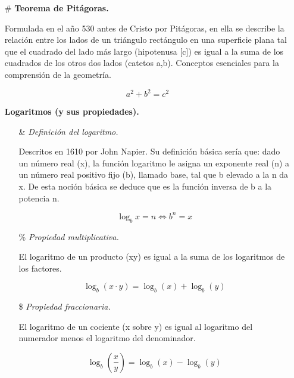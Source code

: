 \documentclass[12pt,letterpaper]{article}
\begin{document}
\begin{itemize}

    \item[\#] \textbf{Teorema de Pitágoras.}\newline
    
    Formulada en el año 530 antes de Cristo por Pitágoras, en ella se describe la relación entre los lados de un triángulo rectángulo en una superficie plana tal que el cuadrado del lado más largo (hipotenusa [c]) es igual a la suma de los cuadrados de los otros dos lados (catetos a,b). Conceptos esenciales para la comprensión de la geometría.
    
    $$a^{2}+b^{2}=c^{2}$$
    
    \item[] \textbf{Logaritmos (y sus propiedades).}\newline

        \begin{itemize}
            
            \item[\&] \textit{Definición del logaritmo.}\newline
            
            Descritos en 1610 por John Napier. Su definición básica sería que: dado un número real (x), la función logaritmo le asigna un exponente real (n) a un número real positivo fijo (b), llamado base, tal que b elevado a la n da x. De esta noción básica se deduce que es la función inversa de b a la potencia n.
    
            $$\log _{b}x=n \Leftrightarrow b^{n}=x$$
            
            \item[\%] \textit{Propiedad multiplicativa.}\newline
    
            El logaritmo de un producto (xy) es igual a la suma de los logaritmos de los factores.
            
            $$\log _{b}(x\cdot y)=\log _{b}(x)+\log _{b}(y)$$
            
            \item[\$] \textit{Propiedad fraccionaria.}\newline
    
            El logaritmo de un cociente (x sobre y) es igual al logaritmo del numerador menos el logaritmo del denominador.
            
            $$\log_{b} (\frac{x}{y}) = \log_{b}(x) -\log_{b}(y)$$
            

\end{itemize}
\end{itemize}
\end{document}
